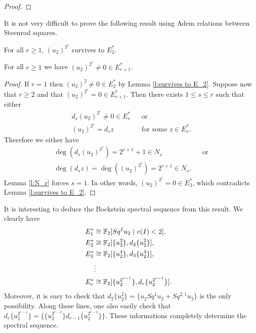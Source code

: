 \begin{proof}
\end{proof}

It is not very difficult to prove the following result using Adem relations between Steenrod squares. 

\begin{lem}\label{l:survives to E_2}
For all $r\geq1$, $(u_2)^{2^r}$ survives to $E_2^*$.
\end{lem}

\begin{prop}
For all $r\geq1$ we have $(u_2)^{2^r}\not=0\in E_{r+1}^*$.
\end{prop}

\begin{proof}
If $r=1$ then $(u_2)^2\not=0\in E_2^*$ by Lemma \ref{l:survives to E_2}. Suppose now that $r\geq2$ and that $(u_2)^{2^r}=0\in E_{r+1}^*$. Then there exists $1\leq s\leq r$ such that either 
\begin{align*}
&d_s(u_2)^{2^r}\not=0\in E_s^* &&\text{or}\\
&(u_2)^{2^r}=d_s z &&\text{for some $z\in E_s^*$.}
\end{align*} 
Therefore we either have 
\begin{align*}
&\deg(d_s(u_2)^{2^r})=2^{r+1}+1\in N_s &&\text{or}\\
&\deg(d_s z)=\deg((u_2)^{2^r})=2^{r+1}\in N_s.
\end{align*}
Lemma \ref{l:N_r} forces $s=1$. In other words, $(u_2)^{2^r}=0\in E_2^*$, which contradicts Lemma \ref{l:survives to E_2}.
\end{proof}

It is interesting to deduce the Bockstein spectral sequence from this result. We clearly have
\begin{align*}
E_1^* &\cong\mathbb{F}_2[Sq^I u_2\ |\ e(I)<2 ],\\
E_2^* &\cong\mathbb{F}_2[\{u_2^2\},d_2\{u_2^2\}],\\
E_3^* &\cong\mathbb{F}_2[\{u_2^4\},d_3\{u_2^4\}],\\
&\vdots\\
E_r^* &\cong\mathbb{F}_2[\{u_2^{2^{r-1}}\},d_r\{u_2^{2^{r-1}}\}].
\end{align*}
Moreover, it is easy to check that $d_2\{u_2^2\}=\{u_2Sq^1u_2+Sq^{2,1}u_2\}$ is the only possibility. Along these lines, one also easily check that $d_r\{u_2^{2^{r-1}}\}=\{\{u_2^{2^{r-2}}\}d_{r-1}\{u_2^{2^{r-2}}\}\}$. These informations completely determine the spectral sequence.

\endinput